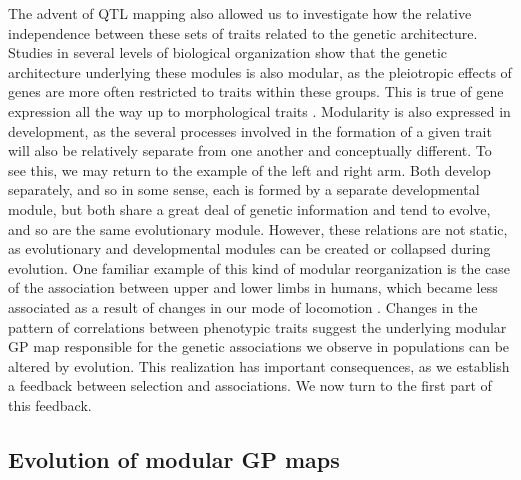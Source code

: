 \begin{refsection}
The advent of QTL mapping also allowed us to investigate how the
relative independence between these sets of traits related to the
genetic architecture. Studies in several levels of biological
organization show that the genetic architecture underlying these modules
is also modular, as the pleiotropic effects of genes are more often
restricted to traits within these groups. This is true of gene
expression \parencite{Hartwell1999-as, Segal2003-oq} all the way up to
morphological traits \parencite{Mezey2000-rs}. Modularity is also expressed
in development, as the several processes involved in the formation of a
given trait will also be relatively separate from one another and
conceptually different. To see this, we may return to the example of the
left and right arm. Both develop separately, and so in some sense, each
is formed by a separate developmental module, but both share a great
deal of genetic information and tend to evolve, and so are the same
evolutionary module. However, these relations are not static, as
evolutionary and developmental modules can be created or collapsed
during evolution. One familiar example of this kind of modular
reorganization is the case of the association between upper and lower
limbs in humans, which became less associated as a result of changes in
our mode of locomotion \parencite{Young2010-rm}. Changes in the pattern of
correlations between phenotypic traits suggest the underlying modular GP
map responsible for the genetic associations we observe in populations
can be altered by evolution. This realization has important
consequences, as we establish a feedback between selection and
associations. We now turn to the first part of this feedback.

\subsection{Evolution of modular GP
maps}\label{evolution-of-modular-gp-maps}


\end{refsection}
